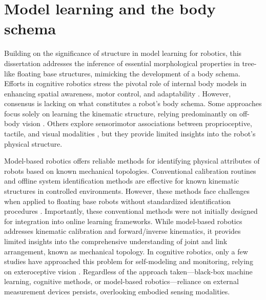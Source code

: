 \section{Model learning and the body schema}




Building on the significance of structure in model learning for robotics, this dissertation addresses the inference of essential morphological properties in tree-like floating base structures, mimicking the development of a body schema. Efforts in cognitive robotics stress the pivotal role of internal body models in enhancing spatial awareness, motor control, and adaptability \cite{Nguyen2021Sensorimotorrepresentationlearning,Hoffmann2010Bodyschemarobotics}. However, consensus is lacking on what constitutes a robot's body schema. Some approaches focus solely on learning the kinematic structure, relying predominantly on off-body vision \cite{Hersch2008Onlinelearningbody,MartinezCantin2010Bodyschemaacquisition,Hart2011roboticmodelecological,Lipson2019Taskagnosticself,Chen2022Fullybodyvisual,Sturm2009Bodyschemalearning}. Others explore sensorimotor associations between proprioceptive, tactile, and visual modalities \cite{Fuke2007BodyImageConstructed,Malinovska2022connectionistmodelassociating,Nguyen2019Reachingdevelopmentvisuo,Pugach2019BrainInspiredCoding,Lanillos2016Yieldingselfperception}, but they provide limited insights into the robot's physical structure.

Model-based robotics offers reliable methods for identifying physical attributes of robots based on known mechanical topologies. Conventional calibration routines \cite{Hollerbach1996CalibrationIndexTaxonomy} and offline system identification methods \cite{Swevers2007Dynamicmodelidentification,LeboutetInertialParameterIdentification} are effective for known kinematic structures in controlled environments. However, these methods face challenges when applied to floating base robots without standardized identification procedures \cite{Ayusawa2014Identifiabilityidentificationinertial,Lee2022OptimizedSystemIdentification}. Importantly, these conventional methods were not initially designed for integration into online learning frameworks. While model-based robotics addresses kinematic calibration and forward/inverse kinematics, it provides limited insights into the comprehensive understanding of joint and link arrangement, known as mechanical topology. In cognitive robotics, only a few studies have approached this problem for self-modeling and monitoring, relying on exteroceptive vision \cite{Bongard2006Automatedsynthesisbody,Bongard2006Resilientmachinescontinuous}. Regardless of the approach taken---black-box machine learning, cognitive methods, or model-based robotics---reliance on external measurement devices persists, overlooking embodied sensing modalities.

